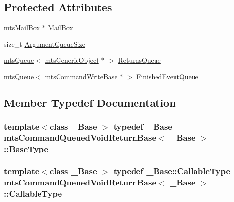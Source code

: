 \subsection*{Protected Attributes}
\begin{DoxyCompactItemize}
\item 
\hyperlink{classmts_mail_box}{mts\+Mail\+Box} $\ast$ \hyperlink{classmts_command_queued_void_return_base_a5e0f1804f0fe7a3aa22cf92eb013cc54}{Mail\+Box}
\item 
size\+\_\+t \hyperlink{classmts_command_queued_void_return_base_a3afbf01037322b73778768074d95c9c7}{Argument\+Queue\+Size}
\item 
\hyperlink{classmts_queue}{mts\+Queue}$<$ \hyperlink{classmts_generic_object}{mts\+Generic\+Object} $\ast$ $>$ \hyperlink{classmts_command_queued_void_return_base_a9926c9d6613de0a461be38fcb5739be5}{Returns\+Queue}
\item 
\hyperlink{classmts_queue}{mts\+Queue}$<$ \hyperlink{classmts_command_write_base}{mts\+Command\+Write\+Base} $\ast$ $>$ \hyperlink{classmts_command_queued_void_return_base_a465d5cf2576bc4c931ee7f436846051e}{Finished\+Event\+Queue}
\end{DoxyCompactItemize}


\subsection{Member Typedef Documentation}
\hypertarget{classmts_command_queued_void_return_base_a29c68cf6ce656cb59012c2e8086c8f8d}{}
\subsubsection[{Base\+Type}]{\setlength{\rightskip}{0pt plus 5cm}template$<$class \+\_\+\+Base $>$ typedef \+\_\+\+Base {\bf mts\+Command\+Queued\+Void\+Return\+Base}$<$ \+\_\+\+Base $>$\+::{\bf Base\+Type}}\label{classmts_command_queued_void_return_base_a29c68cf6ce656cb59012c2e8086c8f8d}
\hypertarget{classmts_command_queued_void_return_base_a66e6a106a0c17625d9f0ec9a33ff634a}{}
\subsubsection[{Callable\+Type}]{\setlength{\rightskip}{0pt plus 5cm}template$<$class \+\_\+\+Base $>$ typedef \+\_\+\+Base\+::\+Callable\+Type {\bf mts\+Command\+Queued\+Void\+Return\+Base}$<$ \+\_\+\+Base $>$\+::{\bf Callable\+Type}}\label{classmts_command_queued_void_return_base_a66e6a106a0c17625d9f0ec9a33ff634a}
\hypertarget{classmts_command_queued_void_return_base_a336bb46e1c968dc3003f9dc163c9f82c}{}
